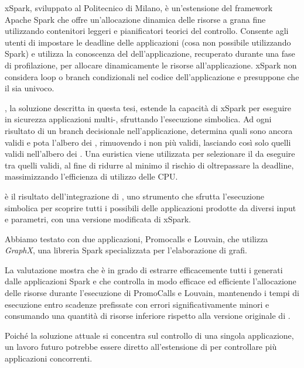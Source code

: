 xSpark, sviluppato al Politecnico di Milano, è un'estensione del framework Apache Spark che offre un'allocazione dinamica delle risorse a grana fine utilizzando contenitori leggeri e pianificatori teorici del controllo. Consente agli utenti di impostare le deadline delle applicazioni (cosa non  possibile utilizzando Spark) e utilizza la conoscenza del \plan dell'applicazione, recuperato durante una fase di profilazione, per allocare dinamicamente le risorse all'applicazione.
xSpark non considera loop o branch condizionali nel codice dell'applicazione e presuppone che il  \plan sia univoco.

\tool, la soluzione descritta in questa tesi, estende la capacità di xSpark per eseguire in sicurezza applicazioni multi-\plan, sfruttando l'esecuzione simbolica. Ad ogni risultato di un branch decisionale nell'applicazione, \tool determina quali \plans sono ancora validi e pota l'albero dei \plans, rimuovendo i \plans non più validi, lasciando così solo quelli validi nell'albero dei \plans. Una euristica viene utilizzata per selezionare il \plan da eseguire tra quelli validi, al fine di ridurre al minimo il rischio di oltrepassare la deadline, massimizzando l'efficienza di utilizzo delle CPU.

\tool è il risultato dell'integrazione di \dSymb, uno strumento che sfrutta l'esecuzione simbolica per scoprire tutti i possibili {\plan} delle applicazioni prodotte da diversi input e parametri, con una versione modificata di xSpark.

Abbiamo testato \tool con due applicazioni, Promocalls e Louvain, che utilizza \textit{GraphX}, una libreria Spark specializzata per l'elaborazione di grafi.

La valutazione mostra che \approach è in grado di estrarre efficacemente tutti i \plans generati dalle applicazioni Spark e che \tool controlla in modo efficace ed efficiente l'allocazione delle risorse durante l'esecuzione di PromoCalls e Louvain, mantenendo i tempi di esecuzione entro scadenze prefissate con errori significativamente minori e consumando una quantità di risorse inferiore rispetto alla versione originale di \cSpark.

Poiché la soluzione attuale si concentra sul controllo di una singola applicazione, un lavoro futuro potrebbe essere diretto all'estensione di \tool per controllare più applicazioni concorrenti.

\endgroup
